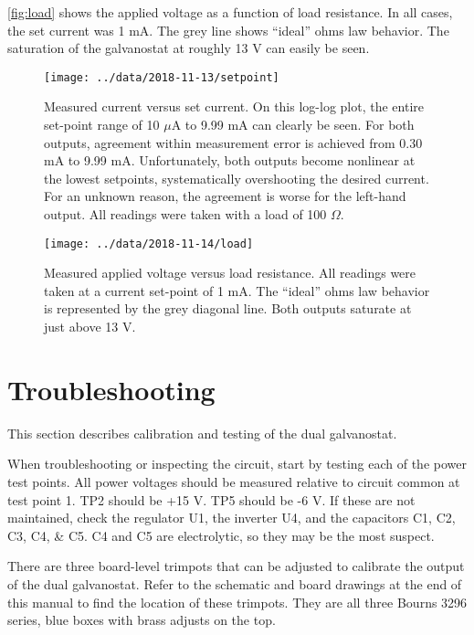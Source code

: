 \documentclass{manual}
\begin{document}
\autoref{fig:load} shows the applied voltage as a function of load resistance.
In all cases, the set current was 1 mA.
The grey line shows ``ideal'' ohms law behavior.
The saturation of the galvanostat at roughly 13 V can easily be seen.

\clearpage
\begin{figure}
  \texttt{[image: ../data/2018-11-13/setpoint]}
  \caption{
    Measured current versus set current.
    On this log-log plot, the entire set-point range of 10 $\mu$A to 9.99 mA can clearly be seen.
    For both outputs, agreement within measurement error is achieved from 0.30 mA to 9.99 mA.
    Unfortunately, both outputs become nonlinear at the lowest setpoints, systematically overshooting the desired current.
    For an unknown reason, the agreement is worse for the left-hand output.
    All readings were taken with a load of 100 $\Omega$.
  }
  \label{fig:setpoint}
\end{figure}
\clearpage

\clearpage
\begin{figure}
  \texttt{[image: ../data/2018-11-14/load]}
  \caption{
    Measured applied voltage versus load resistance.
    All readings were taken at a current set-point of 1 mA.
    The ``ideal'' ohms law behavior is represented by the grey diagonal line.
    Both outputs saturate at just above 13 V.
  }
  \label{fig:load}
\end{figure}
\clearpage

\section{Troubleshooting}

This section describes calibration and testing of the dual galvanostat.

When troubleshooting or inspecting the circuit, start by testing each of the power test points.
All power voltages should be measured relative to circuit common at test point 1.
TP2 should be +15 V.
TP5 should be -6 V.
If these are not maintained, check the regulator U1, the inverter U4, and the capacitors C1, C2, C3, C4, \& C5.
C4 and C5 are electrolytic, so they may be the most suspect.

There are three board-level trimpots that can be adjusted to calibrate the output of the dual galvanostat.
Refer to the schematic and board drawings at the end of this manual to find the location of these trimpots.
They are all three Bourns 3296 series, blue boxes with brass adjusts on the top.
\end{document}
